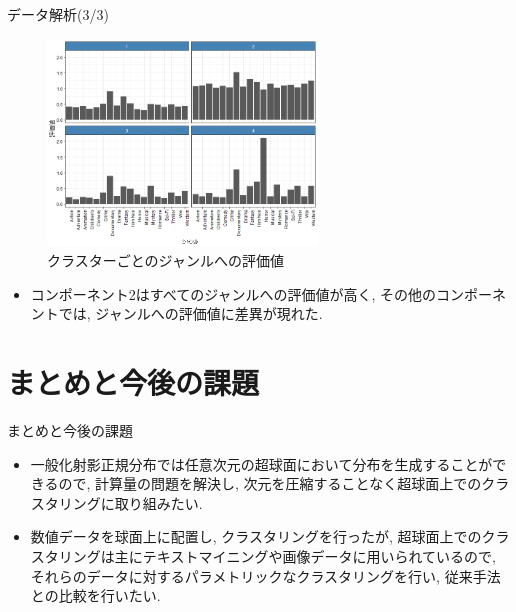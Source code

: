 \documentclass[dvipdfmx]{beamer} %
\begin{document}
\begin{frame}{データ解析(3/3)}
\begin{figure}[tbp]
\begin{center}
\includegraphics[clip,height= 55mm]{data/cluster_plot.png}
\end{center}
\caption{クラスターごとのジャンルへの評価値}
\label{clustergenre}
\end{figure}

\begin{itemize}
	\item コンポーネント2はすべてのジャンルへの評価値が高く, その他のコンポーネントでは, ジャンルへの評価値に差異が現れた.
\end{itemize}
\end{frame}

\section{まとめと今後の課題}
\begin{frame}{まとめと今後の課題}

\begin{itemize}

\item
一般化射影正規分布では任意次元の超球面において分布を生成することができるので, 計算量の問題を解決し, 次元を圧縮することなく超球面上でのクラスタリングに取り組みたい. 
\item
数値データを球面上に配置し, クラスタリングを行ったが, 超球面上でのクラスタリングは主にテキストマイニングや画像データに用いられているので, それらのデータに対するパラメトリックなクラスタリングを行い, 従来手法との比較を行いたい. 

\end{itemize}

\end{frame}
\end{document}
